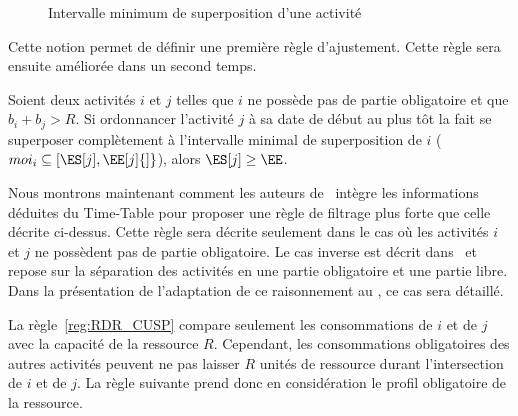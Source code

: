 \begin{ex}
\begin{figure}[!htb]
{
}
      \caption{Intervalle minimum de superposition d'une activité}
    \label{fig:moi_CUSP}
  \end{figure}
\end{ex}

Cette notion permet de définir une première règle d'ajustement. Cette
règle sera ensuite améliorée dans un second temps. 

\begin{reg}
\label{reg:RDR_CUSP}
  Soient deux activités $i$ et $j$ telles que $i$ ne possède pas de
  partie obligatoire et que $b_i+b_j > R$. Si ordonnancer l'activité
 $j$ à sa date de début au plus tôt la fait se superposer complètement
 à l’intervalle minimal de superposition de $i$ ($moi_i \subseteq
 [\ES[j],\EE[j]{]}$), alors $\ES[j] \ge \EE$.
\end{reg}

\begin{ex}

\end{ex}

Nous montrons maintenant comment les auteurs de~\cite{Gay2015} intègre
les informations déduites du Time-Table pour proposer une règle de
filtrage plus forte que celle décrite ci-dessus. Cette règle sera
décrite seulement dans le cas où les activités $i$ et $j$ ne possèdent
pas de partie obligatoire. Le cas inverse est décrit
dans~\cite{Gay2015} et repose sur la séparation des activités en une
partie obligatoire et une partie libre. Dans la présentation de
l'adaptation de ce raisonnement au \CECSP, ce cas sera détaillé.

La règle~\ref{reg:RDR_CUSP} compare seulement les consommations de $i$
et de $j$ avec la capacité de la ressource $R$. Cependant, les
consommations obligatoires des autres activités peuvent ne pas laisser
$R$ unités de ressource durant l'intersection de $i$ et de $j$. La
règle suivante prend donc en considération le profil obligatoire de la
ressource. 

